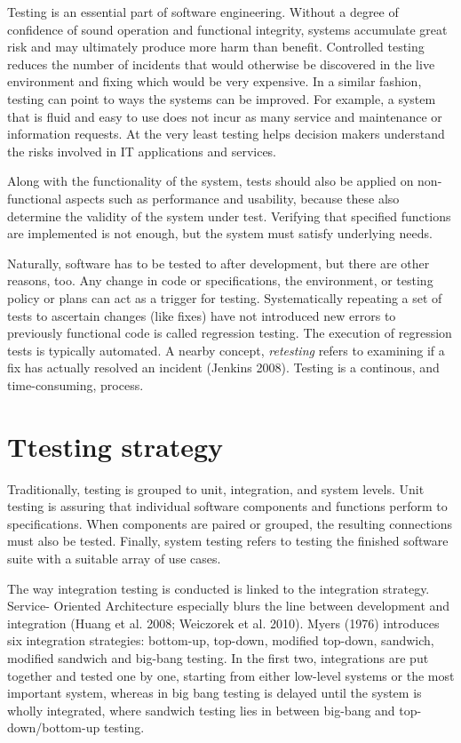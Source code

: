 \documentclass[12pt,a4paper,oneside,pdftex]{report}
\begin{document}
Testing is an essential part of software engineering. Without a degree of confidence of sound 
operation and functional integrity, systems accumulate great risk and may ultimately produce more 
harm than benefit. Controlled testing reduces the number of incidents that would otherwise be discovered in the live environment and fixing which would be very expensive. In a similar fashion, testing can point to ways the systems can be improved. For example, a system that is fluid and easy to use does not incur as many service and maintenance or information requests. At the very least testing helps decision makers understand the risks involved in IT applications and services.

Along with the functionality of the system, tests should also be applied on non-functional aspects such as performance and usability, because these also determine the validity of the system under test. Verifying that specified functions are implemented is not enough, but the system must satisfy underlying needs.

Naturally, software has to be tested to after development, but there are other reasons, too. Any change in code or specifications, the environment, or testing policy or plans can act as a trigger for testing. Systematically repeating a set of tests to ascertain changes (like fixes) have not introduced new errors to previously functional code is called regression testing. The execution of regression tests is typically automated. A nearby concept, \textit{retesting} refers to examining if a fix has actually resolved an incident (Jenkins 2008). Testing is a continous, and time-consuming, process.

\section{Ttesting strategy}
Traditionally, testing is grouped to unit, integration, and system 
levels. Unit testing is assuring that individual software components and functions perform to 
specifications. When components are paired or grouped, the resulting connections must also 
be tested. Finally, system testing refers to testing the finished software suite with 
a suitable array of use cases.

The way integration testing is conducted is linked to the integration strategy. Service-
Oriented Architecture especially blurs the line between development and integration (Huang et al. 2008; Weiczorek et al. 2010). Myers (1976) introduces six integration strategies: bottom-up, top-down,
modified top-down, sandwich, modified sandwich and big-bang testing. In the first two, 
integrations are put together and tested one by one, starting from either low-level systems 
or the most important system, whereas in big bang testing is delayed until the 
system is wholly integrated, where sandwich testing lies in between big-bang and top-
down/bottom-up testing.
\end{document}

